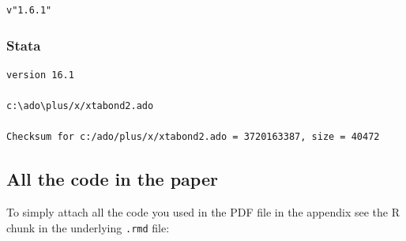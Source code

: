 \documentclass[
  12pt,
]{article}
\begin{document}
\begin{verbatim}
v"1.6.1"
\end{verbatim}

\hypertarget{stata}{%
\subsubsection{Stata}\label{stata}}

\begin{verbatim}
version 16.1

c:\ado\plus/x/xtabond2.ado

Checksum for c:/ado/plus/x/xtabond2.ado = 3720163387, size = 40472
\end{verbatim}

\hypertarget{all-the-code-in-the-paper}{%
\subsection{All the code in the paper}\label{all-the-code-in-the-paper}}

To simply attach all the code you used in the PDF file in the appendix see the R chunk in the underlying \texttt{.rmd} file:
\end{document}
